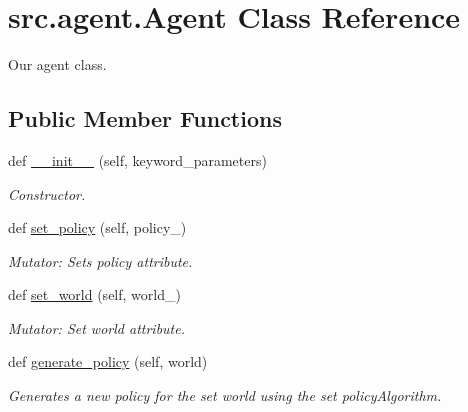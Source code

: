 \hypertarget{classsrc_1_1agent_1_1_agent}{}\section{src.\+agent.\+Agent Class Reference}
\label{classsrc_1_1agent_1_1_agent}


Our agent class.  


\subsection*{Public Member Functions}
\begin{DoxyCompactItemize}
\item 
def \hyperlink{classsrc_1_1agent_1_1_agent_a86883ad8e273a62d61634e0ecbdcf1ed}{\+\_\+\+\_\+init\+\_\+\+\_\+} (self, keyword\+\_\+parameters)
\begin{DoxyCompactList}\small\item\em Constructor. \end{DoxyCompactList}\item 
\mbox{\label{classsrc_1_1agent_1_1_agent_a40e0b7be81cba0248f4b6273d357eb27}} 
def \hyperlink{classsrc_1_1agent_1_1_agent_a40e0b7be81cba0248f4b6273d357eb27}{set\+\_\+policy} (self, policy\+\_\+)
\begin{DoxyCompactList}\small\item\em Mutator\+: Sets policy attribute. \end{DoxyCompactList}\item 
def \hyperlink{classsrc_1_1agent_1_1_agent_a5c84bc253f7ae188d87a839dbe73773a}{set\+\_\+world} (self, world\+\_\+)
\begin{DoxyCompactList}\small\item\em Mutator\+: Set world attribute. \end{DoxyCompactList}\item 
\mbox{\label{classsrc_1_1agent_1_1_agent_af8dd43908b13ad19e99141f606a9beab}} 
def \hyperlink{classsrc_1_1agent_1_1_agent_af8dd43908b13ad19e99141f606a9beab}{generate\+\_\+policy} (self, world)
\begin{DoxyCompactList}\small\item\em Generates a new policy for the set world using the set policy\+Algorithm. \end{DoxyCompactList}\end{DoxyCompactItemize}
